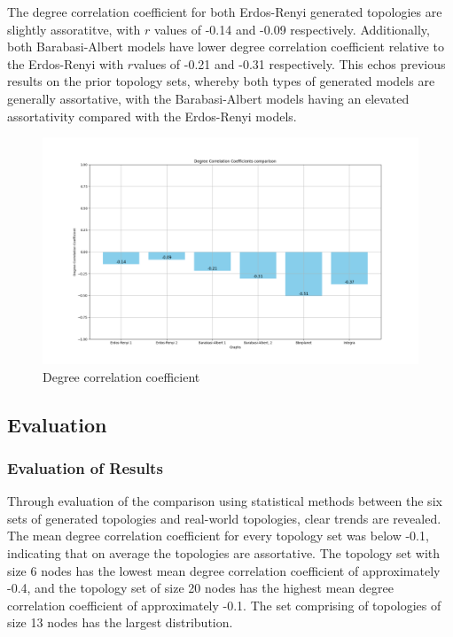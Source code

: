 The degree correlation coefficient for both Erdos-Renyi generated topologies are slightly assoratitve, with $r$ values of -0.14 and -0.09 respectively. Additionally, both Barabasi-Albert models have lower degree correlation coefficient relative to the Erdos-Renyi with $r $values of -0.21 and -0.31 respectively. This echos previous results on the prior topology sets, whereby both types of generated models are generally assortative, with the Barabasi-Albert models having an elevated assortativity compared with the Erdos-Renyi models. 

\begin{figure}
    \centering
    \includegraphics[width=0.9\linewidth]{images/FINAL-TOPO-COMP/Degree-correlation-coeff/deg-coeff-27.png}
    \caption{Degree correlation coefficient}
    \label{fig:enter-label}
\end{figure}

\subsection{Evaluation}
\subsubsection{Evaluation of Results}
Through evaluation of the comparison using statistical methods between the six sets of generated topologies and real-world topologies, clear trends are revealed. The mean degree correlation coefficient for every topology set was below -0.1, indicating that on average the topologies are assortative. The topology set with size 6 nodes has the lowest mean degree correlation coefficient of approximately -0.4, and the topology set of size 20 nodes has the highest mean degree correlation coefficient of approximately -0.1. The set comprising of topologies of size 13 nodes has the largest distribution.    

